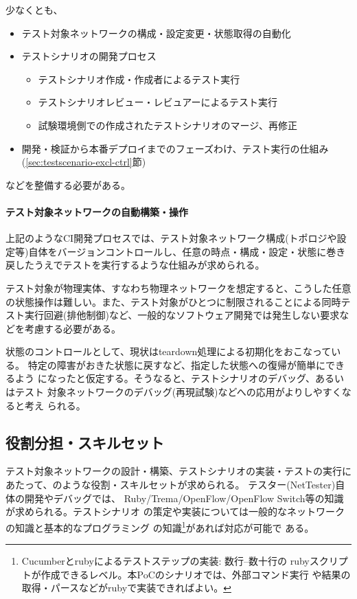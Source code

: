 少なくとも、
\begin{itemize}
 \item テスト対象ネットワークの構成・設定変更・状態取得の自動化
 \item テストシナリオの開発プロセス
       \begin{itemize}
        \item テストシナリオ作成・作成者によるテスト実行
        \item テストシナリオレビュー・レビュアーによるテスト実行
        \item 試験環境側での作成されたテストシナリオのマージ、再修正
       \end{itemize}
 \item 開発・検証から本番デプロイまでのフェーズわけ、テスト実行の仕組み
       (\ref{sec:testscenario-excl-ctrl}節)
\end{itemize}
などを整備する必要がある。

    \paragraph{テスト対象ネットワークの自動構築・操作}
上記のようなCI開発プロセスでは、テスト対象ネットワーク構成(トポロジや設
定等)自体をバージョンコントロールし、任意の時点・構成・設定・状態に巻き
戻したうえでテストを実行するような仕組みが求められる。

テスト対象が物理実体、すなわち物理ネットワークを想定すると、こうした任意
の状態操作は難しい。また、テスト対象がひとつに制限されることによる同時テ
スト実行回避(排他制御)など、一般的なソフトウェア開発では発生しない要求な
どを考慮する必要がある。

状態のコントロールとして、現状はteardown処理による初期化をおこなっている。
特定の障害がおきた状態に戻すなど、指定した状態への復帰が簡単にできるよう
になったと仮定する。そうなると、テストシナリオのデバッグ、あるいはテスト
対象ネットワークのデバッグ(再現試験)などへの応用がよりしやすくなると考え
られる。

  \subsection{役割分担・スキルセット}

テスト対象ネットワークの設計・構築、テストシナリオの実装・テストの実行に
あたって、のような役割・スキルセットが求められる。
テスター(NetTester)自体の開発やデバッグでは、
Ruby/Trema/OpenFlow/OpenFlow Switch等の知識が求められる。テストシナリオ
の策定や実装については一般的なネットワークの知識と基本的なプログラミング
の知識\footnote{Cucumberとrubyによるテストステップの実装: 数行--数十行の
rubyスクリプトが作成できるレベル。本PoCのシナリオでは、外部コマンド実行
や結果の取得・パースなどがrubyで実装できればよい。}があれば対応が可能で
ある。

